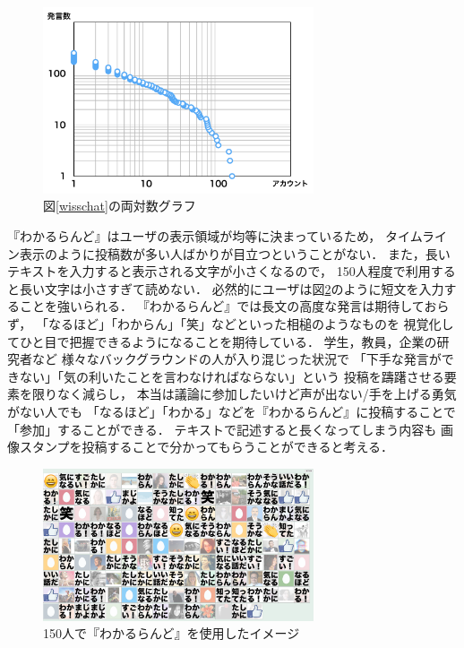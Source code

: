 \begin{figure}[h]
\centering\includegraphics[width=8cm]{images/powerlaw.png}
\caption{図\ref{wisschat}の両対数グラフ}
\label{powerlaw}
\end{figure}

『わかるらんど』はユーザの表示領域が均等に決まっているため，
タイムライン表示のように投稿数が多い人ばかりが目立つということがない．
また，長いテキストを入力すると表示される文字が小さくなるので，
150人程度で利用すると長い文字は小さすぎて読めない．
必然的にユーザは図\ref{wakaruland150}のように短文を入力することを強いられる．
『わかるらんど』では長文の高度な発言は期待しておらず，
「なるほど」「わからん」「笑」などといった相槌のようなものを
視覚化してひと目で把握できるようになることを期待している．
学生，教員，企業の研究者など
様々なバックグラウンドの人が入り混じった状況で
「下手な発言ができない」「気の利いたことを言わなければならない」という
投稿を躊躇させる要素を限りなく減らし，
本当は議論に参加したいけど声が出ない/手を上げる勇気がない人でも
「なるほど」「わかる」などを『わかるらんど』に投稿することで「参加」することができる．
テキストで記述すると長くなってしまう内容も
画像スタンプを投稿することで分かってもらうことができると考える．

\begin{figure}[h]
\centering
\includegraphics[width=8cm]{images/wakaruland150.png}
\caption{150人で『わかるらんど』を使用したイメージ}
\label{wakaruland150}
\end{figure}

